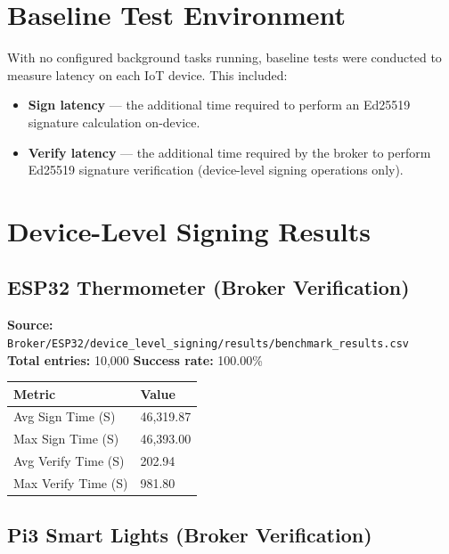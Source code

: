 \documentclass[11pt,letterpaper]{article}
\newcommand{\us}{\textmu{}S}   %
\newcommand{\code}[1]{\texttt{#1}}
\begin{document}
\section{Baseline Test Environment}

With no configured background tasks running, baseline tests were conducted to
measure latency on each IoT device.  This included:
\begin{itemize}[noitemsep]
    \item \textbf{Sign latency} --- the additional time required to perform an
          Ed25519 signature calculation on-device.
    \item \textbf{Verify latency} --- the additional time required by the broker
          to perform Ed25519 signature verification (device-level signing
          operations only).
\end{itemize}

\section{Device-Level Signing Results}

\subsection{ESP32 Thermometer (Broker Verification)}

\textbf{Source:} \code{Broker/ESP32/device\_level\_signing/results/benchmark\_results.csv}\\
\textbf{Total entries:} 10,000 \quad \textbf{Success rate:} 100.00\%

\begin{tabular}{@{}L{6cm}R{4cm}@{}}
\toprule
\textbf{Metric} & \textbf{Value} \\
\midrule
Avg Sign Time (\us) & 46,319.87 \\
Max Sign Time (\us) & 46,393.00 \\
Avg Verify Time (\us) & 202.94 \\
Max Verify Time (\us) & 981.80 \\
\bottomrule
\end{tabular}

\subsection{Pi3 Smart Lights (Broker Verification)}
\end{document}
